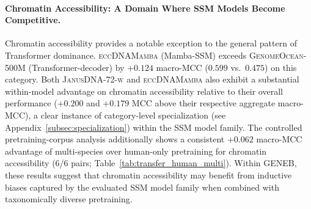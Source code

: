 \documentclass{article}
\theoremstyle{plain}
\theoremstyle{definition}
\theoremstyle{remark}
\begin{document}
\paragraph{Chromatin Accessibility: A Domain Where SSM Models Become Competitive.}
Chromatin accessibility provides a notable exception to the general
pattern of Transformer dominance. \textsc{eccDNAMamba} (Mamba-SSM)
exceeds \textsc{GenomeOcean-500M} (Transformer-decoder) by $+0.124$
macro-MCC ($0.599$ vs.\ $0.475$) on this category. Both \textsc{JanusDNA-72-w} and \textsc{eccDNAMamba} also exhibit a
substantial within-model advantage on chromatin accessibility
relative to their overall performance ($+0.200$ and $+0.179$ MCC
above their respective aggregate macro-MCC), a clear instance of
category-level specialization (see Appendix~\ref{subsec:specialization}) within the SSM model family. The controlled pretraining-corpus
analysis additionally shows a consistent $+0.062$ macro-MCC advantage
of multi-species over human-only pretraining for chromatin
accessibility ($6$/$6$ pairs;
Table~\ref{tab:transfer_human_multi}). Within GENEB, these results
suggest that chromatin accessibility may benefit from inductive biases
captured by the evaluated SSM model family when combined with
taxonomically diverse pretraining.
\end{document}
